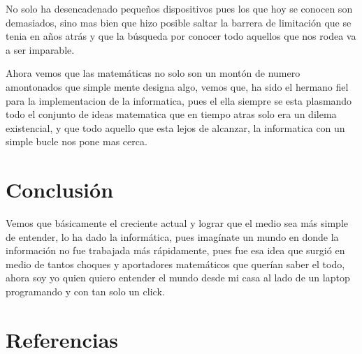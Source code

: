 \documentclass[11pt]{article}
\begin{document}
No solo ha desencadenado pequeños dispositivos pues los que hoy se conocen son demasiados, sino mas bien que hizo posible saltar la barrera de limitación que se tenia en años atrás y que la búsqueda por conocer todo aquellos que nos rodea va a ser imparable.

Ahora vemos que las matemáticas no solo son un montón de numero amontonados que simple mente designa algo, vemos que, ha sido el hermano fiel para la implementacion de la informatica, pues el ella siempre se esta plasmando todo el conjunto de ideas matematica que en tiempo atras solo era un dilema existencial, y que todo aquello que esta lejos de alcanzar, la informatica con un simple bucle nos pone mas cerca.

 
 


\section{Conclusión}

Vemos que básicamente el creciente actual y lograr que el medio sea más simple de entender, lo ha dado la informática, pues imagínate un mundo en donde la información no fue trabajada más rápidamente, pues fue esa idea que surgió en medio de tantos choques y aportadores matemáticos que querían saber el todo, ahora soy yo quien quiero entender el mundo desde mi casa al lado de un laptop programando y con tan solo un click.

\section{Referencias}
\href{https://www.youtube.com/watch?v=gbMZspfWTXI}\\
\href{http://gaceta.rsme.es/abrir.php?id=97}\\
\href{https://blogs.elpais.com/turing/2012/07/turing-el-nacimiento-del-hombre-1912-la-maquina-1936-y-el-test-1950.html}\\
\href{https://www.bbc.com/mundo/noticias-45300219}\\
\href{http://bibliotecadigital.ilce.edu.mx/sites/ciencia/volumen3/ciencia3/112/htm/sec_22.htm}\\
\end{document}

